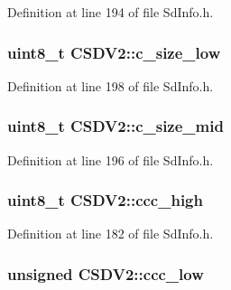 Definition at line 194 of file Sd\+Info.\+h.

\subsubsection[{\texorpdfstring{c\+\_\+size\+\_\+low}{c\_size\_low}}]{\setlength{\rightskip}{0pt plus 5cm}uint8\+\_\+t C\+S\+D\+V2\+::c\+\_\+size\+\_\+low}\hypertarget{struct_c_s_d_v2_aa3717fe7ec52d0336e3729144c15ca3d}{}\label{struct_c_s_d_v2_aa3717fe7ec52d0336e3729144c15ca3d}


Definition at line 198 of file Sd\+Info.\+h.

\subsubsection[{\texorpdfstring{c\+\_\+size\+\_\+mid}{c\_size\_mid}}]{\setlength{\rightskip}{0pt plus 5cm}uint8\+\_\+t C\+S\+D\+V2\+::c\+\_\+size\+\_\+mid}\hypertarget{struct_c_s_d_v2_a7f5abf62601418f93bf7db3e4c44cf17}{}\label{struct_c_s_d_v2_a7f5abf62601418f93bf7db3e4c44cf17}


Definition at line 196 of file Sd\+Info.\+h.

\subsubsection[{\texorpdfstring{ccc\+\_\+high}{ccc\_high}}]{\setlength{\rightskip}{0pt plus 5cm}uint8\+\_\+t C\+S\+D\+V2\+::ccc\+\_\+high}\hypertarget{struct_c_s_d_v2_a577a7333925acccced97b25905f50c6e}{}\label{struct_c_s_d_v2_a577a7333925acccced97b25905f50c6e}


Definition at line 182 of file Sd\+Info.\+h.

\subsubsection[{\texorpdfstring{ccc\+\_\+low}{ccc\_low}}]{\setlength{\rightskip}{0pt plus 5cm}unsigned C\+S\+D\+V2\+::ccc\+\_\+low}\hypertarget{struct_c_s_d_v2_ae40da77d4c0d6c911ebd868eceda8ea9}{}\label{struct_c_s_d_v2_ae40da77d4c0d6c911ebd868eceda8ea9}


